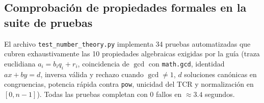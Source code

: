 \subsection{Comprobación de propiedades formales en la suite de pruebas}
El archivo \texttt{test\_number\_theory.py} implementa 34 pruebas automatizadas que cubren exhaustivamente las 10 propiedades algebraicas exigidas por la guía (traza euclidiana $a_i = b_i q_i + r_i$, coincidencia de $\gcd$ con \texttt{math.gcd}, identidad $ax+by=d$, inversa válida y rechazo cuando $\gcd \neq 1$, $d$ soluciones canónicas en congruencias, potencia rápida contra \texttt{pow}, unicidad del TCR y normalización en $[0, n-1]$). Todas las pruebas completan con 0 fallos en $\approx 3.4$ segundos.
